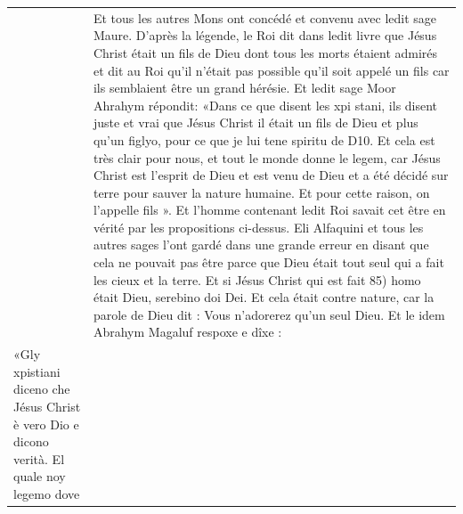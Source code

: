 \begin{longtable}{p{}p{}}
& 

Et tous les autres Mons ont concédé et convenu avec ledit sage Maure. D'après la légende, le Roi dit dans ledit livre que Jésus Christ était un fils de Dieu dont tous les morts étaient admirés et dit au Roi qu'il n'était pas possible qu'il soit appelé un fils car ils semblaient être un grand hérésie. Et ledit sage Moor Ahrahym répondit: «Dans ce que disent les xpi stani, ils disent juste et vrai que Jésus Christ
il était un fils de Dieu et plus qu'un figlyo, pour ce que je lui tene spiritu
de D10. Et cela est très clair pour nous, et tout le monde donne le legem, car Jésus Christ est l'esprit de Dieu et est venu de Dieu et a été décidé sur terre pour sauver la nature humaine. Et pour cette raison, on l'appelle fils ». Et l'homme contenant ledit Roi savait cet être en vérité par les propositions ci-dessus.
Eli Alfaquini et tous les autres sages l'ont gardé dans une grande erreur en disant que cela ne pouvait pas être parce que Dieu était tout seul qui a fait les cieux et la terre. Et si Jésus Christ qui est fait
85) homo était Dieu, serebino doi Dei. Et cela était contre nature, car la parole de Dieu dit : Vous n'adorerez qu'un seul Dieu. Et le idem Abrahym Magaluf respoxe e dîxe : \\

«Gly xpistiani diceno che Jésus Christ è vero Dio e dicono verità. El quale noy legemo dove
&


\end{longtable}

